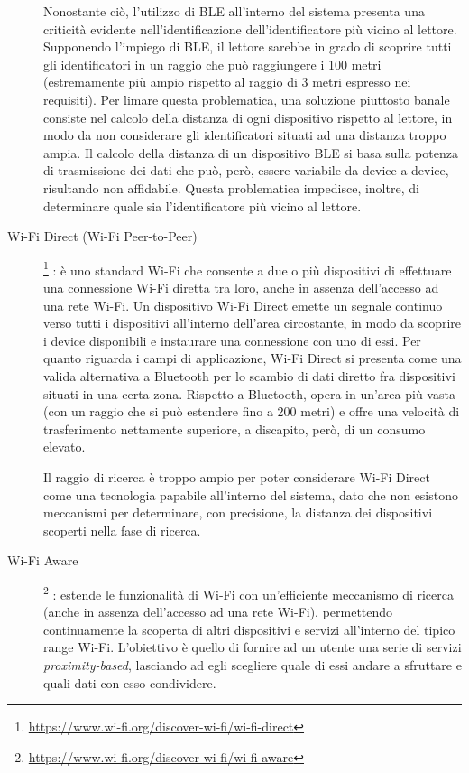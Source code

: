 \documentclass[a4paper,12pt]{report}
\begin{document}
\begin{description}
	Nonostante ciò, l'utilizzo di BLE all'interno del sistema presenta una criticità evidente nell'identificazione dell'identificatore più vicino al lettore. Supponendo l'impiego di BLE, il lettore sarebbe in grado di scoprire tutti gli identificatori in un raggio che può raggiungere i 100 metri (estremamente più ampio rispetto al raggio di 3 metri espresso nei requisiti). Per limare questa problematica, una soluzione piuttosto banale consiste nel calcolo della distanza di ogni dispositivo rispetto al lettore, in modo da non considerare gli identificatori situati ad una distanza troppo ampia. Il calcolo della distanza di un dispositivo BLE si basa sulla potenza di trasmissione dei dati che può, però, essere variabile da device a device, risultando non affidabile. Questa problematica impedisce, inoltre, di determinare quale sia l'identificatore più vicino al lettore.
	
	\item[Wi-Fi Direct (Wi-Fi Peer-to-Peer)]\footnote{\url{https://www.wi-fi.org/discover-wi-fi/wi-fi-direct}} : è uno standard Wi-Fi che consente a due o più dispositivi di effettuare una connessione Wi-Fi diretta tra loro, anche in assenza dell'accesso ad una rete Wi-Fi. Un dispositivo Wi-Fi Direct emette un segnale continuo verso tutti i dispositivi all'interno dell'area circostante, in modo da scoprire i device disponibili e instaurare una connessione con uno di essi. Per quanto riguarda i campi di applicazione, Wi-Fi Direct si presenta come una valida alternativa a Bluetooth per lo scambio di dati diretto fra dispositivi situati in una certa zona. Rispetto a Bluetooth, opera in un'area più vasta (con un raggio che si può estendere fino a 200 metri) e offre una velocità di trasferimento nettamente superiore, a discapito, però, di un consumo elevato. 
	
	Il raggio di ricerca è troppo ampio per poter considerare Wi-Fi Direct come una tecnologia papabile all'interno del sistema, dato che non esistono meccanismi per determinare, con precisione, la distanza dei dispositivi scoperti nella fase di ricerca.
	
	\item[Wi-Fi Aware]\footnote{\url{https://www.wi-fi.org/discover-wi-fi/wi-fi-aware}} : estende le funzionalità di Wi-Fi con un'efficiente meccanismo di ricerca (anche in assenza dell'accesso ad una rete Wi-Fi), permettendo continuamente la scoperta di altri dispositivi e servizi all'interno del tipico range Wi-Fi. L'obiettivo è quello di fornire ad un utente una serie di servizi \emph{proximity-based}, lasciando ad egli scegliere quale di essi andare a sfruttare e quali dati con esso condividere. 
	

\end{description}
\end{document}
